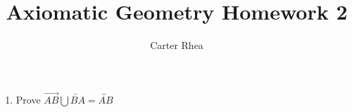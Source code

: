 \documentclass[10pt,a4paper]{article}
\title{Axiomatic Geometry Homework 2}
\author{Carter Rhea}
\begin{document}
\maketitle
\begin{enumerate}
\item Prove $\overrightarrow{AB} \bigcup \overleftarrow{BA}= \overleftrightarrow{AB}$
\end{enumerate}
\end{document}
